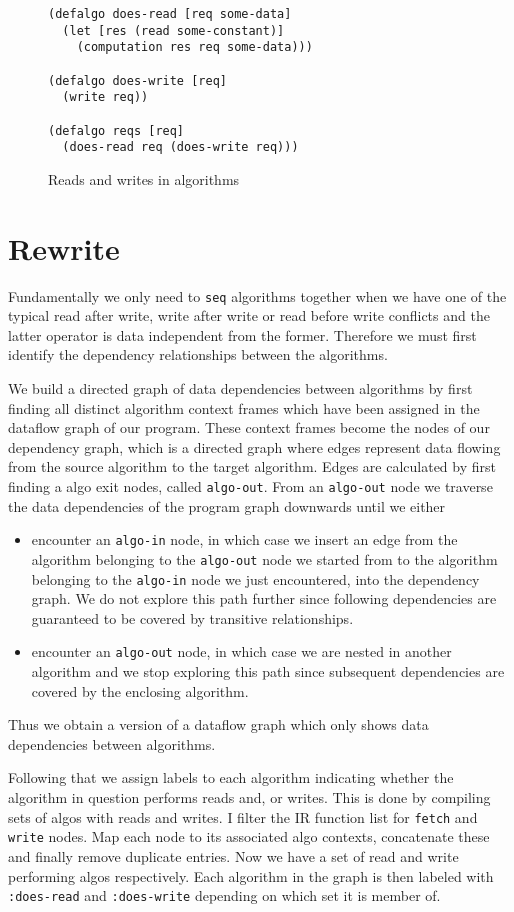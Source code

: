 \begin{figure}
\begin{verbatim}
(defalgo does-read [req some-data]
  (let [res (read some-constant)]
    (computation res req some-data)))

(defalgo does-write [req]
  (write req))

(defalgo reqs [req]
  (does-read req (does-write req)))
\end{verbatim}
\caption{Reads and writes in algorithms}
\label{fig:reads-and-writes-in-algos}
\end{figure}

\section{Rewrite}

Fundamentally we only need to \texttt{seq} algorithms together when we have one of the typical read after write, write after write or read before write conflicts and the latter operator is data independent from the former.
Therefore we must first identify the dependency relationships between the algorithms.

We build a directed graph of data dependencies between algorithms by first finding all distinct algorithm context frames which have been assigned in the dataflow graph of our program.
These context frames become the nodes of our dependency graph, which is a directed graph where edges represent data flowing from the source algorithm to the target algorithm.
Edges are calculated by first finding a algo exit nodes, called \texttt{algo-out}.
From an \texttt{algo-out} node we traverse the data dependencies of the program graph downwards until we either

\begin{itemize}
  \item encounter an \texttt{algo-in} node, in which case we insert an edge from the algorithm belonging to the \texttt{algo-out} node we started from to the algorithm belonging to the \texttt{algo-in} node we just encountered, into the dependency graph.
    We do not explore this path further since following dependencies are guaranteed to be covered by transitive relationships.
  \item encounter an \texttt{algo-out} node, in which case we are nested in another algorithm and we stop exploring this path since subsequent dependencies are covered by the enclosing algorithm.
\end{itemize}

Thus we obtain a version of a dataflow graph which only shows data dependencies between algorithms.

Following that we assign labels to each algorithm indicating whether the algorithm in question performs reads and, or writes.
This is done by compiling sets of algos with reads and writes.
I filter the IR function list for \texttt{fetch} and \texttt{write} nodes.
Map each node to its associated algo contexts, concatenate these and finally remove duplicate entries.
Now we have a set of read and write performing algos respectively.
Each algorithm in the graph is then labeled with \texttt{:does-read} and \texttt{:does-write} depending on which set it is member of.
